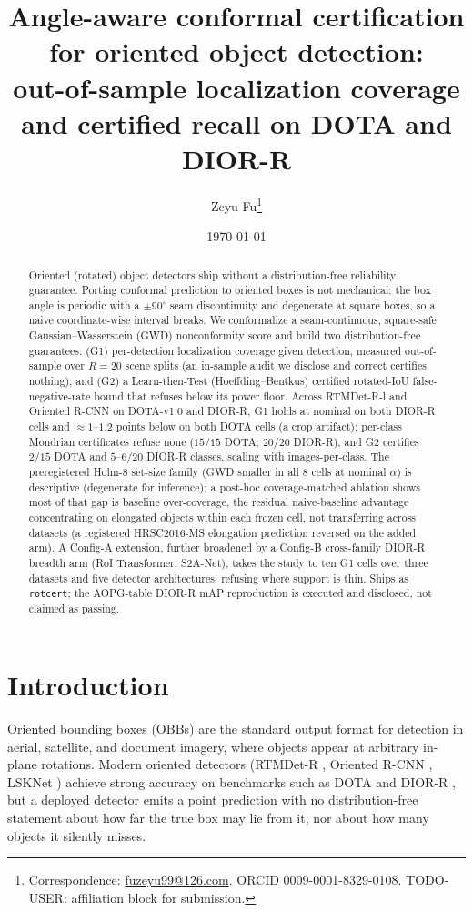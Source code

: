 \documentclass[11pt]{article}
\title{\textbf{Angle-aware conformal certification for oriented object detection:\\
out-of-sample localization coverage and certified recall on DOTA and DIOR-R}}
\author{Zeyu Fu\thanks{Correspondence: \href{mailto:fuzeyu99@126.com}{fuzeyu99@126.com}.
ORCID 0009-0001-8329-0108. TODO-USER: affiliation block for submission.}}
\date{\today}
\begin{document}
\maketitle

\begin{abstract}
\noindent Oriented (rotated) object detectors ship without a distribution-free reliability guarantee. Porting
conformal prediction to oriented boxes is not mechanical: the box angle is periodic with a $\pm 90^\circ$ seam
discontinuity and degenerate at square boxes, so a naive coordinate-wise interval breaks. We conformalize a
seam-continuous, square-safe Gaussian--Wasserstein (GWD) nonconformity score and build two distribution-free
guarantees: (G1) per-detection localization coverage given detection, measured out-of-sample
over $R{=}20$ scene splits (an in-sample audit we disclose and correct certifies nothing); and (G2) a
Learn-then-Test (Hoeffding--Bentkus) certified rotated-IoU false-negative-rate bound that refuses below
its power floor. Across RTMDet-R-l and Oriented R-CNN on DOTA-v1.0 and DIOR-R, G1 holds at nominal on both
DIOR-R cells and $\approx 1$--$1.2$ points below on both DOTA cells (a crop artifact); per-class Mondrian
certificates refuse none ($15/15$ DOTA; $20/20$ DIOR-R), and G2 certifies $2/15$ DOTA and $5$--$6/20$ DIOR-R
classes, scaling with images-per-class. The preregistered Holm-8 set-size family (GWD smaller in all $8$ cells
at nominal $\alpha$) is descriptive (degenerate for inference); a post-hoc coverage-matched ablation
shows most of that gap is baseline over-coverage, the residual naive-baseline advantage concentrating on
elongated objects within each frozen cell, not transferring across datasets (a registered
HRSC2016-MS elongation prediction reversed on the added arm). A Config-A extension, further broadened by a
Config-B cross-family DIOR-R breadth arm (RoI Transformer, S2A-Net), takes the study to ten G1 cells over
three datasets and five detector architectures, refusing where support is thin. Ships as
\texttt{rotcert}; the AOPG-table DIOR-R mAP reproduction is
executed and disclosed, not claimed as passing.
\end{abstract}

\section{Introduction}\label{sec:intro}
Oriented bounding boxes (OBBs) are the standard output format for detection in aerial, satellite, and
document imagery, where objects appear at arbitrary in-plane rotations. Modern oriented detectors
(RTMDet-R \citep{lyu2022rtmdet}, Oriented R-CNN \citep{xie2021orcnn}, LSKNet \citep{li2023lsknet}) achieve
strong accuracy on benchmarks such as DOTA \citep{xia2018dota} and DIOR-R \citep{cheng2022diorr}, but a
deployed detector emits a point prediction with no distribution-free statement about how far the true
box may lie from it, nor about how many objects it silently misses.
\end{document}
